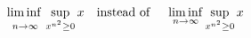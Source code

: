 \documentclass{article}
\begin{document}
\thispagestyle{empty}
\[
  \adjustlimits\liminf_{n\to\infty} \sup_{x^{n^2} \ge 0} x \quad \text{instead of }
  \quad \liminf_{n\to\infty} \sup_{x^{n^2} \ge 0} x
\]
\end{document}
